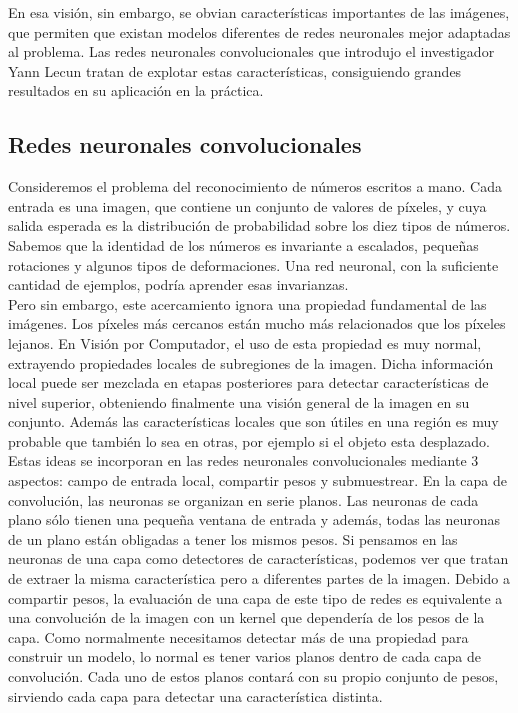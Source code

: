 En esa visión, sin embargo, se obvian características importantes de las imágenes, que permiten que existan modelos diferentes de redes neuronales mejor adaptadas al problema. Las redes neuronales convolucionales que introdujo el investigador Yann Lecun \cite{lecun-89e}\cite{lecun-98} tratan de explotar estas características, consiguiendo grandes resultados en su aplicación en la práctica.\\ 

\subsection{Redes neuronales convolucionales}

Consideremos el problema del reconocimiento de números escritos a mano. Cada entrada es una imagen, que contiene un conjunto de valores de píxeles, y cuya salida esperada es la distribución de probabilidad sobre los diez tipos de números. Sabemos que la identidad de los números es invariante a escalados, pequeñas rotaciones y algunos tipos de deformaciones. Una red neuronal, con la suficiente cantidad de ejemplos, podría aprender esas invarianzas.\\

Pero sin embargo, este acercamiento ignora una propiedad fundamental de las imágenes. Los píxeles más cercanos están mucho más relacionados que los píxeles lejanos. En Visión por Computador, el uso de esta propiedad es muy normal, extrayendo propiedades locales de subregiones de la imagen. Dicha información local puede ser mezclada en etapas posteriores para detectar características de nivel superior, obteniendo finalmente una visión general de la imagen en su conjunto. Además las características locales que son útiles en una región es muy probable que también lo sea en otras, por ejemplo si el objeto esta desplazado.\\

Estas ideas se incorporan en las redes neuronales convolucionales mediante 3 aspectos: campo de entrada local, compartir pesos y submuestrear. En la capa de convolución, las neuronas se organizan en serie planos. Las neuronas de cada plano sólo tienen una pequeña ventana de entrada y además, todas las neuronas de un plano están obligadas a tener los mismos pesos. Si pensamos en las neuronas de una capa como detectores de características, podemos ver que tratan de extraer la misma característica pero a diferentes partes de la imagen. Debido a compartir pesos, la evaluación de una capa de este tipo de redes es equivalente a una convolución de la imagen con un kernel que dependería de los pesos de la capa. Como normalmente necesitamos detectar más de una propiedad para construir un modelo, lo normal es tener varios planos dentro de cada capa de convolución. Cada uno de estos planos contará con su propio conjunto de pesos, sirviendo cada capa para detectar una característica distinta.\\


